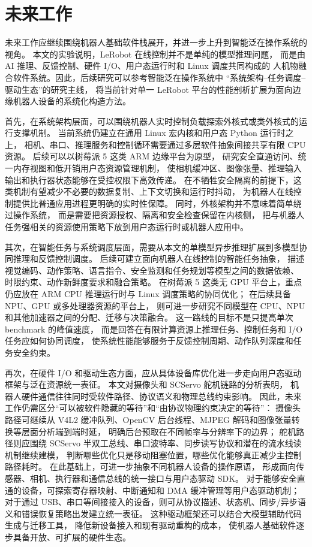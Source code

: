 \section{未来工作}

未来工作应继续围绕机器人基础软件栈展开，并进一步上升到智能泛在操作系统的视角。
本文的实验说明，LeRobot 在线控制并不是单纯的模型推理问题，
而是由 AI 推理、反馈控制、硬件 I/O、用户态运行时和 Linux 调度共同构成的
人机物融合软件系统。因此，后续研究可以参考智能泛在操作系统中
“系统架构--任务调度--驱动生态”的研究主线，
将当前针对单一 LeRobot 平台的性能剖析扩展为面向边缘机器人设备的系统化构造方法。

首先，在系统架构层面，可以围绕机器人实时控制负载探索外核式或类外核式的运行支撑机制。
当前系统仍建立在通用 Linux 宏内核和用户态 Python 运行时之上，
相机、串口、推理服务和控制循环需要通过多层软件抽象间接共享有限 CPU 资源。
后续可以以树莓派 5 这类 ARM 边缘平台为原型，
研究安全直通访问、统一内存视图和低开销用户态资源管理机制，
使相机缓冲区、图像张量、推理输入输出和执行器状态能够在受控权限下高效传递。
在不牺牲安全隔离的前提下，这类机制有望减少不必要的数据复制、上下文切换和运行时抖动，
为机器人在线控制提供比普通应用进程更明确的实时性保障。
同时，外核架构并不意味着简单绕过操作系统，
而是需要把资源授权、隔离和安全检查保留在内核侧，
把与机器人任务强相关的资源使用策略下放到用户态运行时或机器人应用中。

其次，在智能任务与系统调度层面，需要从本文的单模型异步推理扩展到多模型协同推理和反馈控制调度。
后续可建立面向机器人在线控制的智能任务抽象，
描述视觉编码、动作策略、语言指令、安全监测和任务规划等模型之间的数据依赖、
时限约束、动作新鲜度要求和融合策略。
在树莓派 5 这类无 GPU 平台上，重点仍应放在 ARM CPU 推理运行时与 Linux 调度策略的协同优化；
在后续具备 NPU、GPU 或多处理器资源的平台上，
则可进一步研究不同模型在 CPU、NPU 和其他加速器之间的分配、迁移与决策融合。
这一路线的目标不是只提高单次 benchmark 的峰值速度，
而是回答在有限计算资源上推理任务、控制任务和 I/O 任务应如何协同调度，
使系统性能能够服务于反馈控制周期、动作队列深度和任务安全约束。

再次，在硬件 I/O 和驱动生态方面，应从具体设备库优化进一步走向用户态驱动框架与泛在资源统一表征。
本文对摄像头和 SCServo 舵机链路的分析表明，
机器人硬件通信往往同时受软件路径、协议语义和物理总线约束影响。
因此，未来工作仍需区分“可以被软件隐藏的等待”和“由协议物理约束决定的等待”：
摄像头路径可继续从 V4L2 缓冲队列、OpenCV 后台线程、MJPEG 解码和图像张量转换等层面分析端到端时延，
明确后台预取在不同帧率与分辨率下的边界；
舵机路径则应围绕 SCServo 半双工总线、串口波特率、同步读写协议和潜在的流水线读机制继续建模，
判断哪些优化只是移动阻塞位置，哪些优化能够真正减少主控制路径耗时。
在此基础上，可进一步抽象不同机器人设备的操作原语，
形成面向传感器、相机、执行器和通信总线的统一接口与用户态驱动 SDK。
对于能够安全直通的设备，可探索寄存器映射、中断通知和 DMA 缓冲管理等用户态驱动机制；
对于通过 USB、串口等间接接入的设备，则可从协议描述、状态机、同步/异步语义和错误恢复策略出发建立统一表征。
这种驱动框架还可以结合大模型辅助代码生成与迁移工具，
降低新设备接入和现有驱动重构的成本，
使机器人基础软件逐步具备开放、可扩展的硬件生态。

